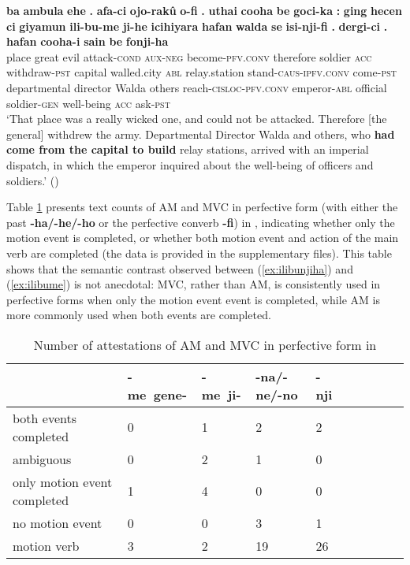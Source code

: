 \documentclass{article}
\newcommand{\ipa}[1]{\textbf{{\phon\mbox{#1}}}} %
\begin{document}
\begin{exe}
\ex \label{ex:ilibume}
\gll
\ipa{ba} 	\ipa{ambula} 	\ipa{ehe} 	\ipa{.} 	\ipa{afa-ci} 	\ipa{ojo-rakû} 	\ipa{o-fi} 	\ipa{.} 	\ipa{uthai} 	\ipa{cooha} 	\ipa{be} 	\ipa{goci-ka} 	\ipa{:} 	\ipa{ging} 	\ipa{hecen} 	\ipa{ci} 	\ipa{giyamun} 	\ipa{ili-bu-me} 	\ipa{ji-he} 	\ipa{icihiyara} 	\ipa{hafan} 	\ipa{walda} 	\ipa{se} 	\ipa{isi-nji-fi} 	\ipa{.} 	\ipa{dergi-ci} 	\ipa{.} 	\ipa{hafan} 	\ipa{cooha-i} 	\ipa{sain} 	\ipa{be} 	\ipa{fonji-ha} \\
place great evil { } attack-\textsc{cond} \textsc{aux-neg} become-\textsc{pfv.conv} { } therefore soldier \textsc{acc} withdraw-\textsc{pst} { } capital walled.city \textsc{abl} relay.station stand-\textsc{caus-ipfv.conv} come-\textsc{pst} departmental director Walda others reach-\textsc{cisloc-pfv.conv} { } emperor-\textsc{abl} { } official soldier-\textsc{gen} well-being \textsc{acc} ask-\textsc{pst} \\
\glt `That place was a really wicked one, and could not be attacked. Therefore [the general] withdrew the army. Departmental Director Walda and others, who \textbf{had come from the capital to build} relay stations, arrived with an imperial dispatch, in which the emperor inquired about the well-being of officers and soldiers.' (\citealt[94/62]{cosmo06dzengseo})
\end{exe}

Table \ref{tab:counts.dzengsheo} presents text counts of AM and MVC in perfective form (with either the past \ipa{-ha/-he/-ho} or the perfective converb \ipa{-fi}) in \citet{cosmo06dzengseo}, indicating whether only the motion event is completed, or whether both motion event and action of the main verb are completed (the data is provided in the supplementary files). This table shows that the semantic contrast observed between (\ref{ex:ilibunjiha}) and (\ref{ex:ilibume}) is not anecdotal: MVC, rather than AM,  is consistently used in perfective forms when only the motion event event is completed, while AM is more commonly used when both events are completed.


\begin{table}[h]
\caption{Number of attestations of AM and MVC in perfective form in \citet{cosmo06dzengseo} } \centering \label{tab:counts.dzengsheo}
\begin{tabular}{llllllllll}
\toprule
 & 	\ipa{-me gene-} & 	\ipa{-me ji-} & 	\ipa{-na/-ne/-no} & 	\ipa{-nji} & 	\\
 \midrule
both events completed & 	0 & 	1 & 	2 & 	2 & 	\\
ambiguous & 	0 & 	2 & 	1 & 	0 & 	\\
only motion event completed & 	1 & 	4 & 	0 & 	0 & 	\\
no motion event & 	0 & 	0 & 	3 & 	1 & 	\\
motion verb & 	3 & 	2 & 	19 & 	26 & 	\\
\bottomrule
\end{tabular}
\end{table}
\end{document}
